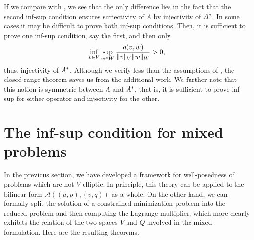 \begin{remark}
  If we compare  with
  , we see that the only
  difference lies in the fact that the second inf-sup condition
  ensures surjectivity of $A$ by injectivity of $A^*$. In some cases
  it may be difficult to prove both inf-sup conditions. Then, it is
  sufficient to prove one inf-sup condition, say the first, and then
  only
  \begin{gather}
     \inf_{v\in V}\sup_{w\in W}
    \frac{a(v,w)}{\lVert v\rVert_V\lVert w\rVert_W} > 0,
  \end{gather}
  thus, injectivity of $A^*$. Although we verify less than the
  assumptions of , the
  closed range theorem saves us from the additional work. We further
  note that this notion is symmetric between $A$ and $A^*$, that is,
  it is sufficient to prove inf-sup for either operator and
  injectivity for the other.
\end{remark}

\section{The inf-sup condition for mixed problems}

\begin{intro}
  In the previous section, we have developed a framework for
  well-posedness of problems which are not $V$-elliptic. In principle,
  this theory can be applied to the bilinear form
  $\mathcal A((u,p),(v,q))$ as a whole. On the other hand, we can
  formally split the solution of a constrained minimization problem
  into the reduced problem and then computing the Lagrange multiplier,
  which more clearly exhibits the relation of the two spaces $V$ and
  $Q$ involved in the mixed formulation. Here are the resulting
  theorems.
\end{intro}

